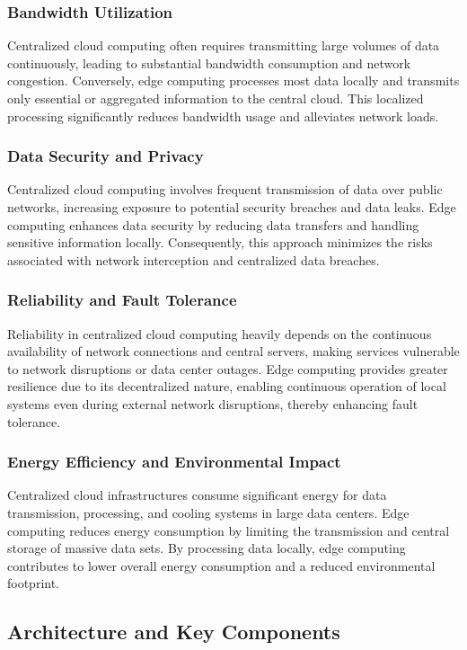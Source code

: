 \documentclass[runningheads]{llncs}
\begin{document}
\subsubsection{Bandwidth Utilization}
Centralized cloud computing often requires transmitting large volumes of data continuously, leading to substantial bandwidth consumption and network congestion. Conversely, edge computing processes most data locally and transmits only essential or aggregated information to the central cloud. This localized processing significantly reduces bandwidth usage and alleviates network loads.

\subsubsection{Data Security and Privacy}
Centralized cloud computing involves frequent transmission of data over public networks, increasing exposure to potential security breaches and data leaks. Edge computing enhances data security by reducing data transfers and handling sensitive information locally. Consequently, this approach minimizes the risks associated with network interception and centralized data breaches.

\subsubsection{Reliability and Fault Tolerance}
Reliability in centralized cloud computing heavily depends on the continuous availability of network connections and central servers, making services vulnerable to network disruptions or data center outages. Edge computing provides greater resilience due to its decentralized nature, enabling continuous operation of local systems even during external network disruptions, thereby enhancing fault tolerance.

\subsubsection{Energy Efficiency and Environmental Impact}
Centralized cloud infrastructures consume significant energy for data transmission, processing, and cooling systems in large data centers. Edge computing reduces energy consumption by limiting the transmission and central storage of massive data sets. By processing data locally, edge computing contributes to lower overall energy consumption and a reduced environmental footprint.



\subsection{Architecture and Key Components}
\end{document}

